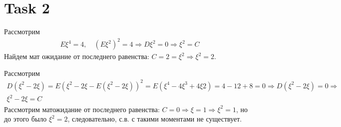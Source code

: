 \section{Task 2}
Рассмотрим
\begin{gather}
    E\xi^4 = 4, \quad (E\xi^2)^2 = 4 \Longrightarrow D\xi^2 = 0 \Longrightarrow \xi^2 = C
\end{gather}
Найдем мат ожидание от последнего равенства: $C = 2 = \xi^2 \Longrightarrow \xi^2 = 2$.

\no Рассмотрим
\begin{gather}
    D(\xi^2 - 2\xi) = E(\xi^2-2\xi - E(\xi^2-2\xi))^2 = E(\xi^4 - 4\xi^3+4\xi2) = 4 - 12 + 8 = 0 \Longrightarrow D(\xi^2 - 2\xi) = 0 \Longrightarrow \\ \xi^2-2\xi = C
\end{gather}
Рассмотрим матожидание от последнего равенства: $C = 0 \Longrightarrow \xi = 1 \Longrightarrow \xi^2 = 1$, но до этого было $\xi^2 = 2$, следовательно, с.в. с такими моментами не существует.